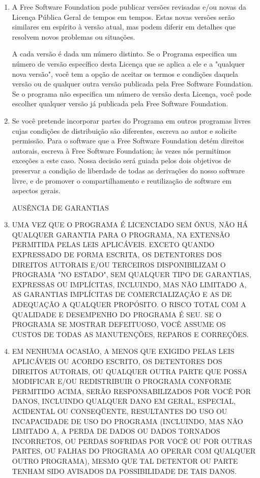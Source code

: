 {\begin{enumerate}
\item A Free Software Foundation pode publicar versões revisadas e/ou
novas da Licença Pública Geral de tempos em tempos. Estas novas
versões serão similares em espírito à versão atual, mas podem diferir
em detalhes que resolvem novos problemas ou situações.

A cada versão é dada um número distinto. Se o Programa especifica um
número de versão específico desta Licença que se aplica a ele e a
"qualquer nova versão", você tem a opção de aceitar os termos e
condições daquela versão ou de qualquer outra versão publicada pela
Free Software Foundation. Se o programa não especifica um número de
versão desta Licença, você pode escolher qualquer versão já publicada
pela Free Software Foundation.

\item Se você pretende incorporar partes do Programa em outros
programas livres cujas condições de distribuição são diferentes,
escreva ao autor e solicite permissão. Para o software que a Free
Software Foundation detém direitos autorais, escreva à Free Software
Foundation; às vezes nós permitimos exceções a este caso. Nossa
decisão será guiada pelos dois objetivos de preservar a condição de
liberdade de todas as derivações do nosso software livre, e de
promover o compartilhamento e reutilização de software em aspectos
gerais.

\begin{center}
                  AUSÊNCIA DE GARANTIAS
\end{center}

\item UMA VEZ QUE O PROGRAMA É LICENCIADO SEM ÔNUS, NÃO HÁ QUALQUER
GARANTIA PARA O PROGRAMA, NA EXTENSÃO PERMITIDA PELAS LEIS
APLICÁVEIS. EXCETO QUANDO EXPRESSADO DE FORMA ESCRITA, OS DETENTORES
DOS DIREITOS AUTORAIS E/OU TERCEIROS DISPONIBILIZAM O PROGRAMA "NO
ESTADO", SEM QUALQUER TIPO DE GARANTIAS, EXPRESSAS OU IMPLÍCITAS,
INCLUINDO, MAS NÃO LIMITADO A, AS GARANTIAS IMPLÍCITAS DE
COMERCIALIZAÇÃO E AS DE ADEQUAÇÃO A QUALQUER PROPÓSITO. O RISCO TOTAL
COM A QUALIDADE E DESEMPENHO DO PROGRAMA É SEU. SE O PROGRAMA SE
MOSTRAR DEFEITUOSO, VOCÊ ASSUME OS CUSTOS DE TODAS AS MANUTENÇÕES,
REPAROS E CORREÇÕES.

\item EM NENHUMA OCASIÃO, A MENOS QUE EXIGIDO PELAS LEIS APLICÁVEIS OU
ACORDO ESCRITO, OS DETENTORES DOS DIREITOS AUTORAIS, OU QUALQUER OUTRA
PARTE QUE POSSA MODIFICAR E/OU REDISTRIBUIR O PROGRAMA CONFORME
PERMITIDO ACIMA, SERÃO RESPONSABILIZADOS POR VOCÊ POR DANOS, INCLUINDO
QUALQUER DANO EM GERAL, ESPECIAL, ACIDENTAL OU CONSEQÜENTE,
RESULTANTES DO USO OU INCAPACIDADE DE USO DO PROGRAMA (INCLUINDO, MAS
NÃO LIMITADO A, A PERDA DE DADOS OU DADOS TORNADOS INCORRETOS, OU
PERDAS SOFRIDAS POR VOCÊ OU POR OUTRAS PARTES, OU FALHAS DO PROGRAMA
AO OPERAR COM QUALQUER OUTRO PROGRAMA), MESMO QUE TAL DETENTOR OU
PARTE TENHAM SIDO AVISADOS DA POSSIBILIDADE DE TAIS DANOS.
\end{enumerate}

}
